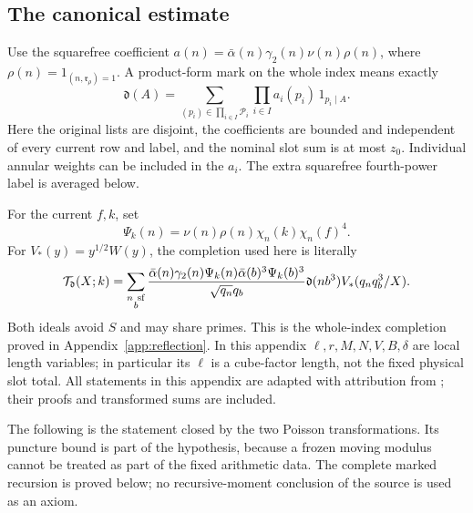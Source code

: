 \documentclass[12pt]{article}
\begin{document}
\subsection{The canonical estimate}

Use the squarefree coefficient
\(a(n)=\bar\alpha(n)\gamma_2(n)\nu(n)\rho(n)\), where
\(\rho(n)=1_{(n,\mathfrak r_\rho)=1}\).
A product-form mark on the whole index means exactly
\begin{equation}\label{own:mark-definition}
 \mathfrak d(A)=\sum_{(p_i)\in\prod_{i\in I}\mathcal P_i}
           \prod_{i\in I}a_i(p_i)\,1_{p_i\mid A}.
\end{equation}
Here the original lists are disjoint, the coefficients are bounded and
independent of every current row and label, and the nominal slot sum
is at most \(z_0\).  Individual annular weights can be included in
the \(a_i\).  The extra squarefree fourth-power label is averaged below.

For the current \(f,k\), set
\[
 \Psi_k(n)=\nu(n)\rho(n)\chi_n(k)\chi_n(f)^4 .
\]
For \(V_*(y)=y^{1/2}W(y)\), the completion used here is literally
\begin{equation}\label{eq:marked-completion}
 \mathcal T_{\mathfrak d}(X;k)=
 \sum_{\substack{n\ {\rm sf}\\b}}
 \frac{\bar\alpha(n)\gamma_2(n)\Psi_k(n)
           \bar\alpha(b)^3\Psi_k(b)^3}{\sqrt{q_n}q_b}
             \mathfrak d(nb^3)V_*(q_nq_b^3/X).
\end{equation}
Both ideals avoid \(S\) and may share primes.
This is the whole-index completion proved in Appendix~\ref{app:reflection}.
In this appendix \(\ell,r,M,N,V,B,\delta\) are local length
variables; in particular its \(\ell\) is a cube-factor length,
not the fixed physical slot total.
All statements in this appendix are adapted with attribution from
\cite[Section 17]{QRH}; their proofs and transformed sums are included.

The following is the statement closed by the two Poisson transformations.
Its puncture bound is part of the hypothesis, because a frozen moving
modulus cannot be treated as part of the fixed arithmetic data.
The complete marked recursion is proved below; no recursive-moment
conclusion of the source is used as an axiom.
\end{document}

